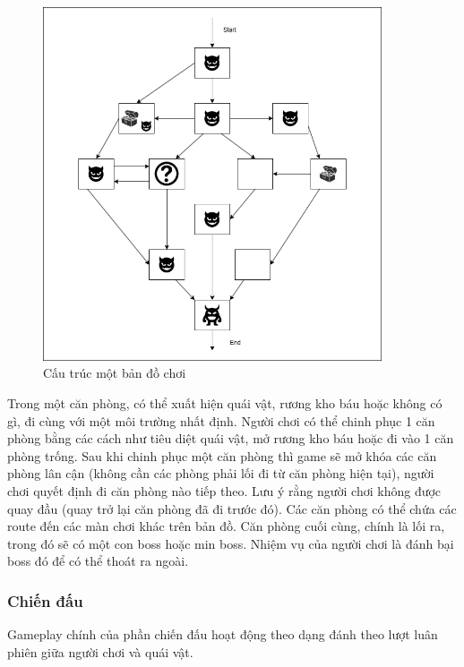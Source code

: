 \begin{figure}[H]
	\centering
	\includegraphics[width=10cm]{Images/SampleLevel.png}
	\vspace{0.5cm}
	\caption{Cấu trúc một bản đồ chơi}
\end{figure}

\hspace*{0.5cm}Trong một căn phòng, có thể xuất hiện quái vật, rương kho báu hoặc không có gì, đi cùng với một môi trường nhất định. Người chơi có thể chinh phục 1 căn phòng bằng các cách như tiêu diệt quái vật, mở rương kho báu hoặc đi vào 1 căn phòng trống. Sau khi chinh phục một căn phòng thì game sẽ mở khóa các căn phòng lân cận (không cần các phòng phải lối đi từ căn phòng hiện tại), người chơi quyết định đi căn phòng nào tiếp theo. Lưu ý rằng người chơi không được quay đầu (quay trở lại căn phòng đã đi trước đó). Các căn phòng có thể chứa các route đến các màn chơi khác trên bản đồ. Căn phòng cuối cùng, chính là lối ra, trong đó sẽ có một con boss hoặc min boss. Nhiệm vụ của người chơi là đánh bại boss đó để có thể thoát ra ngoài.\\
\subsubsection{Chiến đấu}
\hspace*{0.5cm}Gameplay chính của phần chiến đấu hoạt động theo dạng đánh theo lượt luân phiên giữa người chơi và quái vật.


